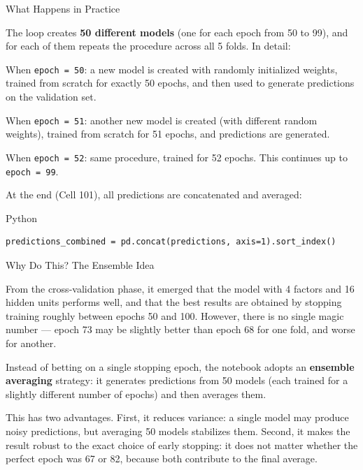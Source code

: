 \documentclass[aspectratio=169, 11pt]{beamer}
\begin{document}
\begin{frame}[fragile]{What Happens in Practice}

The loop creates \textbf{50 different models} (one for each epoch from 50 to 99), and for each of them repeats the procedure across all 5 folds. In detail:

\vspace{0.3cm}

When \texttt{epoch = 50}: a new model is created with randomly initialized weights, trained from scratch for exactly 50 epochs, and then used to generate predictions on the validation set.

\vspace{0.3cm}

When \texttt{epoch = 51}: another new model is created (with different random weights), trained from scratch for 51 epochs, and predictions are generated.

\vspace{0.3cm}

When \texttt{epoch = 52}: same procedure, trained for 52 epochs. This continues up to \texttt{epoch = 99}.

\vspace{0.3cm}

At the end (Cell 101), all predictions are concatenated and averaged:

\vspace{0.2cm}

\begin{block}{Python}
\small
\begin{verbatim}
predictions_combined = pd.concat(predictions, axis=1).sort_index()
\end{verbatim}
\end{block}

\end{frame}
%
%
\begin{frame}{Why Do This? The Ensemble Idea}

From the cross-validation phase, it emerged that the model with 4 factors and 16 hidden units performs well, and that the best results are obtained by stopping training roughly between epochs 50 and 100. However, there is no single magic number — epoch 73 may be slightly better than epoch 68 for one fold, and worse for another.

\vspace{0.3cm}

Instead of betting on a single stopping epoch, the notebook adopts an \textbf{ensemble averaging} strategy: it generates predictions from 50 models (each trained for a slightly different number of epochs) and then averages them.

\vspace{0.3cm}

This has two advantages. First, it reduces variance: a single model may produce noisy predictions, but averaging 50 models stabilizes them. Second, it makes the result robust to the exact choice of early stopping: it does not matter whether the perfect epoch was 67 or 82, because both contribute to the final average.

\end{frame}
\end{document}
